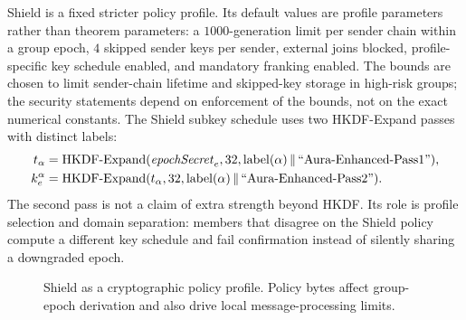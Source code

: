 \documentclass[preprint,12pt]{elsarticle}
\theoremstyle{definition}
\newcommand{\tech}[1]{\textnormal{#1}}
\newcommand{\domain}[1]{\textnormal{``#1''}}
\renewcommand{\mathsf}[1]{\mathrm{#1}}
\newcommand{\Shield}{\tech{Shield}}
\newcommand{\HKDF}{\tech{HKDF}}
\newcommand{\concat}{\,\|\,}
\newcommand{\epochsec}{\mathit{epochSecret}}
\begin{document}
\Shield{} is a fixed stricter policy profile. Its default values are profile
parameters rather than theorem parameters: a $1000$-generation limit per sender
chain within a group epoch, $4$ skipped sender keys per sender, external joins
blocked, profile-specific key schedule enabled, and mandatory franking enabled.
The bounds are chosen to limit sender-chain lifetime and skipped-key storage in
high-risk groups; the security statements depend on enforcement of the bounds,
not on the exact numerical constants. The \Shield{} subkey schedule uses two
HKDF-Expand passes with distinct labels:
\begin{align}
  t_\alpha &=
    \HKDF\text{-}\mathrm{Expand}(\epochsec_e,32,
      \mathsf{label}(\alpha)\concat\domain{Aura-Enhanced-Pass1}),\\
  k^\alpha_e &=
    \HKDF\text{-}\mathrm{Expand}(t_\alpha,32,
      \mathsf{label}(\alpha)\concat\domain{Aura-Enhanced-Pass2}).
\end{align}
The second pass is not a claim of extra strength beyond HKDF. Its role is
profile selection and domain separation: members that disagree on the
\Shield{} policy compute a different key schedule and fail confirmation
instead of silently sharing a downgraded epoch.

\begin{figure}[tbp]
\centering
{}
\caption{\Shield{} as a cryptographic policy profile. Policy bytes affect
group-epoch derivation and also drive local message-processing limits.}
\label{fig:shield}
\end{figure}
\end{document}
